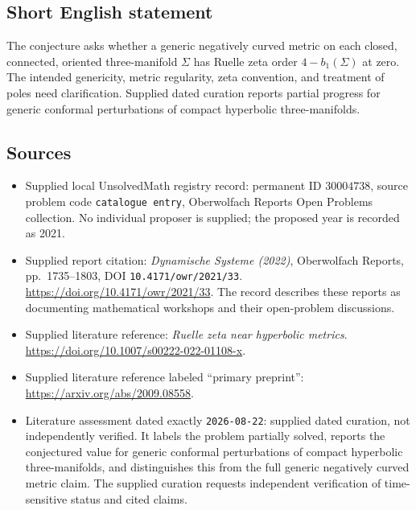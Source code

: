 \documentclass[11pt]{article}
\begin{document}
\subsection{Short English statement}
The conjecture asks whether a generic negatively curved metric on each closed, connected, oriented three-manifold \(\Sigma\) has Ruelle zeta order \(4-b_1(\Sigma)\) at zero. The intended genericity, metric regularity, zeta convention, and treatment of poles need clarification. Supplied dated curation reports partial progress for generic conformal perturbations of compact hyperbolic three-manifolds.
\subsection{Sources}
\begin{itemize}
\item Supplied local UnsolvedMath registry record: permanent ID \(30004738\), source problem code \texttt{catalogue entry}, Oberwolfach Reports Open Problems collection. No individual proposer is supplied; the proposed year is recorded as 2021.
\item Supplied report citation: \emph{Dynamische Systeme (2022)}, Oberwolfach Reports, pp.~1735--1803, DOI \texttt{10.4171/owr/2021/33}. \url{https://doi.org/10.4171/owr/2021/33}. The record describes these reports as documenting mathematical workshops and their open-problem discussions.
\item Supplied literature reference: \emph{Ruelle zeta near hyperbolic metrics}. \url{https://doi.org/10.1007/s00222-022-01108-x}.
\item Supplied literature reference labeled ``primary preprint'': \url{https://arxiv.org/abs/2009.08558}.
\item Literature assessment dated exactly \texttt{2026-08-22}: supplied dated curation, not independently verified. It labels the problem partially solved, reports the conjectured value for generic conformal perturbations of compact hyperbolic three-manifolds, and distinguishes this from the full generic negatively curved metric claim. The supplied curation requests independent verification of time-sensitive status and cited claims.
\end{itemize}
\end{document}
